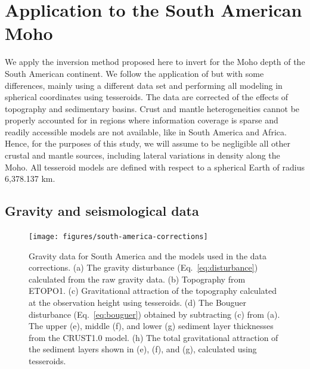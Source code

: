 \documentclass[extra,mreferee]{gji}
\begin{document}
\section{Application to the South American Moho}


We apply the inversion method proposed here to invert for the Moho depth of the
South American continent.
We follow the application of \citet{vandermeijde2013} but with some
differences, mainly using a different data set and performing all modeling
in spherical coordinates using tesseroids.
The data are corrected of the effects of topography and sedimentary basins.
Crust and mantle heterogeneities cannot be properly accounted for
in regions where information coverage is sparse and readily accessible models
are not available, like in South America and Africa.
Hence, for the purposes of this study, we will assume to be negligible all
other crustal and mantle sources, including lateral variations in density along
the Moho.
All tesseroid models are defined with respect to a spherical Earth of radius
6,378.137 km.

\subsection{Gravity and seismological data}

\begin{figure}
    \centering
    \texttt{[image: figures/south-america-corrections]}
    \caption{
        Gravity data for South America and the models used in the data
        corrections.
        (a) The gravity disturbance (Eq.~\ref{eq:disturbance}) calculated from
        the raw gravity data.
        (b) Topography from ETOPO1.
        (c) Gravitational attraction of the topography calculated
        at the observation height using tesseroids.
        (d) The Bouguer disturbance (Eq.~\ref{eq:bouguer}) obtained by
        subtracting (c) from (a).
        The upper (e), middle (f), and lower (g) sediment layer thicknesses
        from the CRUST1.0 model.
        (h) The total gravitational attraction of the sediment layers shown in
        (e), (f), and (g), calculated using tesseroids.
        }
    \label{fig:sam-corrections}
\end{figure}
\end{document}
